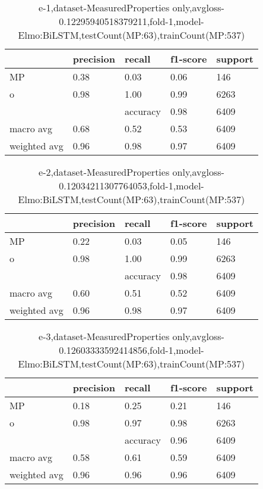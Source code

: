 \begin{table}[!ht] 
\centering
\caption{e-1,dataset-MeasuredProperties only,avgloss-0.12295940518379211,fold-1,model-Elmo:BiLSTM,testCount(MP:63),trainCount(MP:537)}\label{e-1data-mpS.tsv}
\begin{tabularx}{300pt}{|X|X|X|X|X|}
\hline
&precision&recall&f1-score&support\\
\hline
MP&0.38&0.03&0.06&146\\
\hline
o&0.98&1.00&0.99&6263\\
\hline
&&accuracy&0.98&6409\\
\hline
macro avg&0.68&0.52&0.53&6409\\
\hline
weighted avg&0.96&0.98&0.97&6409\\
\hline
\end{tabularx}
\end{table}
\begin{table}[!ht] 
\centering
\caption{e-2,dataset-MeasuredProperties only,avgloss-0.12034211307764053,fold-1,model-Elmo:BiLSTM,testCount(MP:63),trainCount(MP:537)}\label{e-2data-mpS.tsv}
\begin{tabularx}{300pt}{|X|X|X|X|X|}
\hline
&precision&recall&f1-score&support\\
\hline
MP&0.22&0.03&0.05&146\\
\hline
o&0.98&1.00&0.99&6263\\
\hline
&&accuracy&0.98&6409\\
\hline
macro avg&0.60&0.51&0.52&6409\\
\hline
weighted avg&0.96&0.98&0.97&6409\\
\hline
\end{tabularx}
\end{table}
\begin{table}[!ht] 
\centering
\caption{e-3,dataset-MeasuredProperties only,avgloss-0.12603333592414856,fold-1,model-Elmo:BiLSTM,testCount(MP:63),trainCount(MP:537)}\label{e-3data-mpS.tsv}
\begin{tabularx}{300pt}{|X|X|X|X|X|}
\hline
&precision&recall&f1-score&support\\
\hline
MP&0.18&0.25&0.21&146\\
\hline
o&0.98&0.97&0.98&6263\\
\hline
&&accuracy&0.96&6409\\
\hline
macro avg&0.58&0.61&0.59&6409\\
\hline
weighted avg&0.96&0.96&0.96&6409\\
\hline
\end{tabularx}
\end{table}
